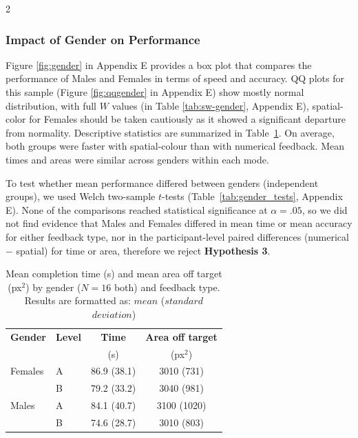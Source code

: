 \documentclass[a4paper,12pt]{article}
\begin{document}
\begin{multicols}{2}
\subsubsection{Impact of Gender on Performance} 
Figure \ref{fig:gender} in Appendix E provides a box plot that compares the performance of Males and  Females in terms of speed and accuracy. QQ plots for this sample (Figure \ref{fig:qqgender} in Appendix E) show mostly normal distribution, with full $W$ values (in Table \ref{tab:sw-gender}, Appendix E), spatial-color for  Females should be taken cautiously as it showed a significant departure from normality. Descriptive statistics are summarized in Table~\ref{tab:gender_desc}. On average, both groups were faster with spatial-colour than with numerical feedback. Mean times and areas were similar across genders within each mode.

To test whether mean performance differed between genders (independent groups), we used Welch two-sample $t$-tests (Table~\ref{tab:gender_tests}, Appendix E). None of the comparisons reached statistical significance at $\alpha = .05$, so we did not find evidence that Males and  Females differed in mean time or mean accuracy for either feedback type, nor in the participant-level paired differences (numerical $-$ spatial) for time or area, therefore we reject \textbf{Hypothesis 3}. 

\begin{table}[H]
  \centering
  \small %
  \caption{Mean completion time (s) and mean area off target (px$^2$) by gender ($N=16$ both) and feedback type. Results are formatted as: $mean$ ($standard$ $deviation$)} 
  \label{tab:gender_desc}
  \begin{tabular}{llcc}
    \toprule
    \textbf{Gender} & \textbf{Level} & \textbf{Time} & \textbf{Area off target} \\
    & & (s) & (px$^2$) \\
    \midrule
     Females & A      & 86.9 (38.1) & 3010 (731) \\
          & B & 79.2 (33.2) & 3040 (981) \\
    \addlinespace
   Males  & A      & 84.1 (40.7) & 3100 (1020) \\
          & B & 74.6 (28.7) & 3010 (803) \\
    \bottomrule
  \end{tabular}
  \vspace{-10pt}
\end{table}


\end{multicols}
\end{document}
